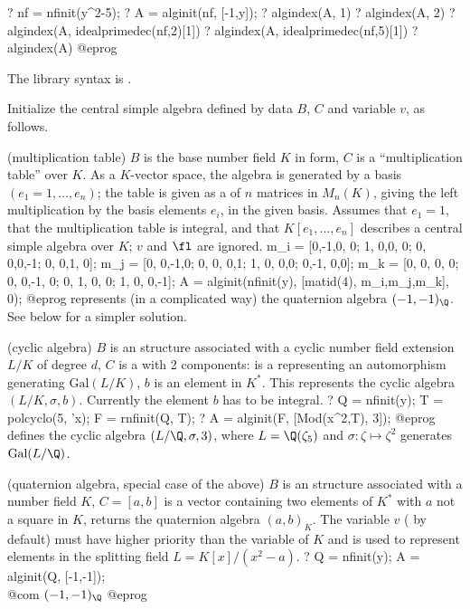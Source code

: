 \bprog
? nf = nfinit(y^2-5);
? A = alginit(nf, [-1,y]);
? algindex(A, 1)
? algindex(A, 2)
? algindex(A, idealprimedec(nf,2)[1])
? algindex(A, idealprimedec(nf,5)[1])
? algindex(A)
@eprog

The library syntax is .

\label{se:alginit}
Initialize the central simple algebra defined by data $B$, $C$ and
variable $v$, as follows.

\item (multiplication table) $B$ is the base number field $K$ in 
form, $C$ is a ``multiplication table'' over $K$.
As a $K$-vector space, the algebra is generated by a basis
$(e_1 = 1,\dots, e_n)$; the table is given as a  of $n$ matrices in
$M_n(K)$, giving the left multiplication by the basis elements $e_i$, in the
given basis.
Assumes that $e_1= 1$, that the multiplication table is integral, and that
$K[e_1,\dots,e_n]$ describes a central simple algebra over $K$; $v$ and $\fl$
are ignored.
\bprog
{ m_i = [0,-1,0, 0;
         1, 0,0, 0;
         0, 0,0,-1;
         0, 0,1, 0];
  m_j = [0, 0,-1,0;
         0, 0, 0,1;
         1, 0, 0,0;
         0,-1, 0,0];
  m_k = [0, 0, 0, 0;
         0, 0,-1, 0;
         0, 1, 0, 0;
         1, 0, 0,-1];
  A = alginit(nfinit(y), [matid(4), m_i,m_j,m_k],  0); }
@eprog represents (in a complicated way) the quaternion algebra $(-1,-1)_\Q$.
See below for a simpler solution.

\item (cyclic algebra) $B$ is an  structure associated with a cyclic
number field extension $L/K$ of degree $d$, $C$ is a 
\kbd{[sigma,b]} with 2 components:  is a  representing
an automorphism generating $\text{Gal}(L/K)$, $b$ is an element in $K^*$. This
represents the cyclic algebra~$(L/K,\sigma,b)$. Currently the element $b$ has
to be integral.
\bprog
 ? Q = nfinit(y); T = polcyclo(5, 'x); F = rnfinit(Q, T);
 ? A = alginit(F, [Mod(x^2,T), 3]);
@eprog defines the cyclic algebra $(L/\Q, \sigma, 3)$, where
$L = \Q(\zeta_5)$ and $\sigma:\zeta\mapsto\zeta^2$ generates
$\text{Gal}(L/\Q)$.

\item (quaternion algebra, special case of the above) $B$ is an 
structure associated with a number field $K$, $C = [a,b]$ is a vector
containing two elements of $K^*$ with $a$ not a square in $K$, returns the quaternion algebra $(a,b)_K$.
The variable $v$ ( by default) must have higher priority than the
variable of $K$ and is used to represent elements in the splitting
field $L = K[x]/(x^2-a)$.
\bprog
 ? Q = nfinit(y); A = alginit(Q, [-1,-1]);  \\@com $(-1,-1)_\Q$
@eprog

